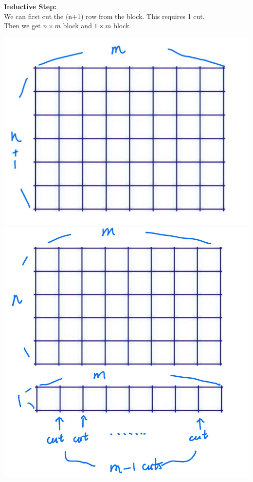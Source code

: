 \documentclass[12pt]{exam}
\begin{document}
\begin{solution}
\begin{qparts}
        \textbf{Inductive Step:}\\
        We can first cut the (n+1) row from the block. This requires 1 cut.\\
        Then we get $n \times m$ block and $1\times m$ block.\\
        \begin{center}
            \includegraphics[scale = 0.15]{WechatIMG676.jpeg}\\
            \includegraphics[scale = 0.15]{WechatIMG675.jpeg}\\

\end{center}
\end{qparts}
\end{solution}
\end{document}
